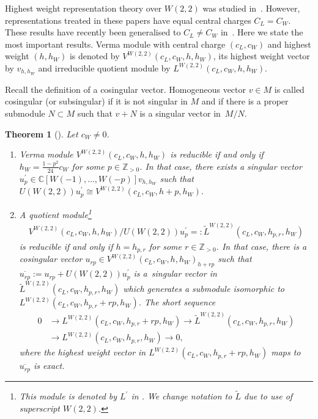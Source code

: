 \documentclass[pdftex]{sigma}
\numberwithin{equation}{section}
\newtheorem{Theorem}{Theorem}[section]
\newcommand{\N}{{\mathbb Z}_{> 0} }
\newcommand{\C}{\mathbb C}
\begin{document}
Highest weight representation theory over $W(2,2)$ was studied in~\cite{JP,R-JMP}. However, representations treated in these papers have
equal central charges $C_{L}=C_{W}$. These results have recently been generalised to $C_{L}\neq C_{W}$ in~\cite{JZ}. Here we state the most important results. Verma module with central charge $(c_{L},c_{W}) $ and highest weight $(h,h_{W}) $ is denoted by $V^{W(2,2)}( c_{L},c_{W},h,h_{W})$, its highest weight vector
by $v_{h,h_W}$ and irreducible quotient module by $L^{W(2,2)} (c_{L},c_{W},h,h_{W})$.

Recall the def\/inition of a cosingular vector. Homogeneous vector $v\in M$ is called cosingular (or subsingular) if it is not singular in $M$ and if there
is a proper submodule $N \subset M$ such that $v+N$ is a singular vector in~$M/N$.

\begin{Theorem}[{\cite{JZ, R-JMP}}]\label{W-struktura}Let $c_{W}\neq0$.
\begin{enumerate}\itemsep=0pt
\item[$(i)$]Verma module $V^{W(2,2)}(c_{L},c_{W},h,h_{W}) $ is reducible if and only if $h_{W}=\frac{1-p^{2}}{24}c_{W}$ for some $p\in \N$. In that case, there exists a singular vector $u_p^{\prime}\in \C [ W(-1) ,\ldots,W(-p)]v_{h,h_W} $ such that $U(W(2,2)) u_p^{\prime} \cong V^{W(2,2)}(c_{L},c_{W},h+p,h_{W}) $.

\item[$(ii)$]A quotient module\footnote{This module is denoted by $L^{\prime}$ in \cite{JZ,R-JMP}. We
change notation to $\widetilde{L}$ due to use of superscript $W(2,2)$.}
\begin{gather*}V^{W(2,2)}(c_{L},c_{W},h,h_{W}) / U(W(2,2)) u_p^{\prime} =: \widetilde{L}^{W(2,2)}( c_{L},c_{W},h_{p,r},h_{W})
\end{gather*}
is reducible if and only if $ h = h_{p,r} $ for some $r\in\N$. In that case, there is a cosingular vector $%
u_{rp}\in V^{W(2,2)}(c_{L},c_{W},h,h_{W}) _{h+rp}$ such that $\overline{u_{rp}} := u_{rp} + U(W(2,2)) u_p^{\prime}$ is a~singular vector in $\widetilde{L}^{W(2,2)}( c_{L},c_{W},h_{p,r},h_{W})$ which generates a submodule isomorphic to $L^{W(2,2)}( c_{L},c_{W},h_{p,r}+rp,h_{W})$. The short sequence
\begin{align}
0 &\rightarrow L^{W(2,2)}(c_{L},c_{W},h_{p,r}+rp,h_{W}) \rightarrow\widetilde{L}^{W(2,2)} ( c_{L},c_{W},h_{p,r},h_{W} ) \nonumber \\
&\rightarrow L^{W(2,2)} ( c_{L},c_{W},h_{p,r},h_{W} ) \rightarrow 0, \label{seq}
\end{align}
where the highest weight vector in $L^{W(2,2)}(c_{L},c_{W},h_{p,r}+rp,h_{W})$ maps to $\overline{u_{rp}}$ is exact.
\end{enumerate}
\end{Theorem}
\end{document}
